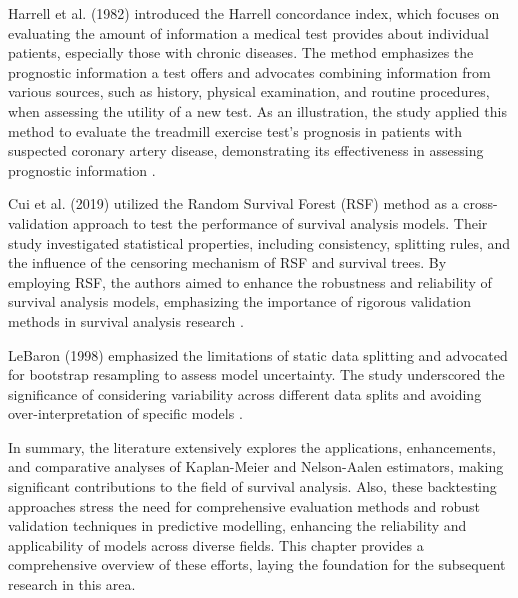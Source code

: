 Harrell et al. (1982) introduced the Harrell concordance index, which focuses on evaluating the amount of information a medical test provides about individual patients, especially those with chronic diseases. The method emphasizes the prognostic information a test offers and advocates combining information from various sources, such as history, physical examination, and routine procedures, when assessing the utility of a new test. As an illustration, the study applied this method to evaluate the treadmill exercise test's prognosis in patients with suspected coronary artery disease, demonstrating its effectiveness in assessing prognostic information \cite{harrell1982evaluating}.

Cui et al. (2019) utilized the Random Survival Forest (RSF) method as a cross-validation approach to test the performance of survival analysis models. Their study investigated statistical properties, including consistency, splitting rules, and the influence of the censoring mechanism of RSF and survival trees. By employing RSF, the authors aimed to enhance the robustness and reliability of survival analysis models, emphasizing the importance of rigorous validation methods in survival analysis research \cite{cui2019consistency}.

LeBaron (1998) emphasized the limitations of static data splitting and advocated for bootstrap resampling to assess model uncertainty. The study underscored the significance of considering variability across different data splits and avoiding over-interpretation of specific models \cite{lebaron1998bootstrap}.

In summary, the literature extensively explores the applications, enhancements, and comparative analyses of Kaplan-Meier and Nelson-Aalen estimators, making significant contributions to the field of survival analysis. Also, these backtesting approaches stress the need for comprehensive evaluation methods and robust validation techniques in predictive modelling, enhancing the reliability and applicability of models across diverse fields. This chapter provides a comprehensive overview of these efforts, laying the foundation for the subsequent research in this area.

